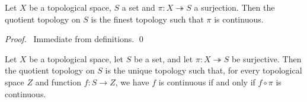 \begin{prop}
Let $X$ be a topological space, $S$ a set and $\pi : X \twoheadrightarrow S$ a surjection. Then the quotient topology on $S$ is the finest topology such that $\pi$ is continuous.
\end{prop}

\begin{proof}
\pf\ Immediate from definitions. \qed
\end{proof}

\begin{thm}
\label{thm:quotient_topology_universal}
Let $X$ be a topological space, let $S$ be a set, and let $\pi : X \twoheadrightarrow S$ be surjective. Then the quotient topology on $S$ is the unique topology such that, for every topological space $Z$ and function $f : S \rightarrow Z$, we have $f$ is continuous if and only if $f \circ \pi$ is continuous.
\end{thm}

